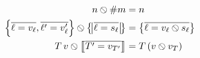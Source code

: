 \begin{align*}
\scast{n}{\ssize{m}} &= n \\
\scast{
  \srecordval{\overline{\ell = v_\ell}, \overline{\ell' = v_\ell'}}}{
  \sproductval{\overline{\ell = s_\ell}}} &=
\srecordval{\overline{\ell = \scast{v_\ell}{s_\ell}}} \\
\scast{T\,v}{\sconcatval{\overline{T' = v_{T'}}}} &= T\,(\scast{v}{v_T})
\end{align*}